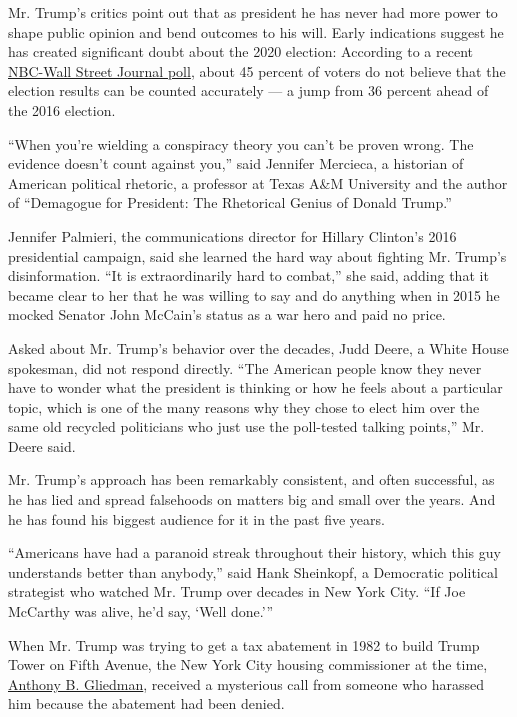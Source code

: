 Mr. Trump's critics point out that as president he has never had more
power to shape public opinion and bend outcomes to his will. Early
indications suggest he has created significant doubt about the 2020
election: According to a recent
\href{https://www.nbcnews.com/politics/2020-election/siloed-nbc-wsj-poll-shows-how-gop-dems-hold-widely-n1236958}{NBC-Wall
Street Journal poll}, about 45 percent of voters do not believe that the
election results can be counted accurately --- a jump from 36 percent
ahead of the 2016 election.

``When you're wielding a conspiracy theory you can't be proven wrong.
The evidence doesn't count against you,'' said Jennifer Mercieca, a
historian of American political rhetoric, a professor at Texas A\&M
University and the author of ``Demagogue for President: The Rhetorical
Genius of Donald Trump.''

Jennifer Palmieri, the communications director for Hillary Clinton's
2016 presidential campaign, said she learned the hard way about fighting
Mr. Trump's disinformation. ``It is extraordinarily hard to combat,''
she said, adding that it became clear to her that he was willing to say
and do anything when in 2015 he mocked Senator John McCain's status as a
war hero and paid no price.

Asked about Mr. Trump's behavior over the decades, Judd Deere, a White
House spokesman, did not respond directly. ``The American people know
they never have to wonder what the president is thinking or how he feels
about a particular topic, which is one of the many reasons why they
chose to elect him over the same old recycled politicians who just use
the poll-tested talking points,'' Mr. Deere said.

Mr. Trump's approach has been remarkably consistent, and often
successful, as he has lied and spread falsehoods on matters big and
small over the years. And he has found his biggest audience for it in
the past five years.

``Americans have had a paranoid streak throughout their history, which
this guy understands better than anybody,'' said Hank Sheinkopf, a
Democratic political strategist who watched Mr. Trump over decades in
New York City. ``If Joe McCarthy was alive, he'd say, `Well done.'''

When Mr. Trump was trying to get a tax abatement in 1982 to build Trump
Tower on Fifth Avenue, the New York City housing commissioner at the
time,
\href{https://www.nytimes3xbfgragh.onion/2002/06/04/nyregion/anthony-b-gliedman-59-dies-new-york-city-housing-official.html}{Anthony
B. Gliedman}, received a mysterious call from someone who harassed him
because the abatement had been denied.

